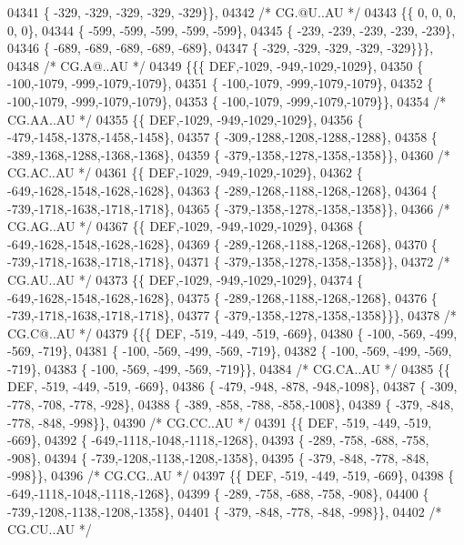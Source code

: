 \begin{DoxyCode}
04341 \{ -329, -329, -329, -329, -329\}\},
04342 \textcolor{comment}{/* CG.@U..AU */}
04343 \{\{    0,    0,    0,    0,    0\},
04344 \{ -599, -599, -599, -599, -599\},
04345 \{ -239, -239, -239, -239, -239\},
04346 \{ -689, -689, -689, -689, -689\},
04347 \{ -329, -329, -329, -329, -329\}\}\},
04348 \textcolor{comment}{/* CG.A@..AU */}
04349 \{\{\{  DEF,-1029, -949,-1029,-1029\},
04350 \{ -100,-1079, -999,-1079,-1079\},
04351 \{ -100,-1079, -999,-1079,-1079\},
04352 \{ -100,-1079, -999,-1079,-1079\},
04353 \{ -100,-1079, -999,-1079,-1079\}\},
04354 \textcolor{comment}{/* CG.AA..AU */}
04355 \{\{  DEF,-1029, -949,-1029,-1029\},
04356 \{ -479,-1458,-1378,-1458,-1458\},
04357 \{ -309,-1288,-1208,-1288,-1288\},
04358 \{ -389,-1368,-1288,-1368,-1368\},
04359 \{ -379,-1358,-1278,-1358,-1358\}\},
04360 \textcolor{comment}{/* CG.AC..AU */}
04361 \{\{  DEF,-1029, -949,-1029,-1029\},
04362 \{ -649,-1628,-1548,-1628,-1628\},
04363 \{ -289,-1268,-1188,-1268,-1268\},
04364 \{ -739,-1718,-1638,-1718,-1718\},
04365 \{ -379,-1358,-1278,-1358,-1358\}\},
04366 \textcolor{comment}{/* CG.AG..AU */}
04367 \{\{  DEF,-1029, -949,-1029,-1029\},
04368 \{ -649,-1628,-1548,-1628,-1628\},
04369 \{ -289,-1268,-1188,-1268,-1268\},
04370 \{ -739,-1718,-1638,-1718,-1718\},
04371 \{ -379,-1358,-1278,-1358,-1358\}\},
04372 \textcolor{comment}{/* CG.AU..AU */}
04373 \{\{  DEF,-1029, -949,-1029,-1029\},
04374 \{ -649,-1628,-1548,-1628,-1628\},
04375 \{ -289,-1268,-1188,-1268,-1268\},
04376 \{ -739,-1718,-1638,-1718,-1718\},
04377 \{ -379,-1358,-1278,-1358,-1358\}\}\},
04378 \textcolor{comment}{/* CG.C@..AU */}
04379 \{\{\{  DEF, -519, -449, -519, -669\},
04380 \{ -100, -569, -499, -569, -719\},
04381 \{ -100, -569, -499, -569, -719\},
04382 \{ -100, -569, -499, -569, -719\},
04383 \{ -100, -569, -499, -569, -719\}\},
04384 \textcolor{comment}{/* CG.CA..AU */}
04385 \{\{  DEF, -519, -449, -519, -669\},
04386 \{ -479, -948, -878, -948,-1098\},
04387 \{ -309, -778, -708, -778, -928\},
04388 \{ -389, -858, -788, -858,-1008\},
04389 \{ -379, -848, -778, -848, -998\}\},
04390 \textcolor{comment}{/* CG.CC..AU */}
04391 \{\{  DEF, -519, -449, -519, -669\},
04392 \{ -649,-1118,-1048,-1118,-1268\},
04393 \{ -289, -758, -688, -758, -908\},
04394 \{ -739,-1208,-1138,-1208,-1358\},
04395 \{ -379, -848, -778, -848, -998\}\},
04396 \textcolor{comment}{/* CG.CG..AU */}
04397 \{\{  DEF, -519, -449, -519, -669\},
04398 \{ -649,-1118,-1048,-1118,-1268\},
04399 \{ -289, -758, -688, -758, -908\},
04400 \{ -739,-1208,-1138,-1208,-1358\},
04401 \{ -379, -848, -778, -848, -998\}\},
04402 \textcolor{comment}{/* CG.CU..AU */}

\end{DoxyCode}
